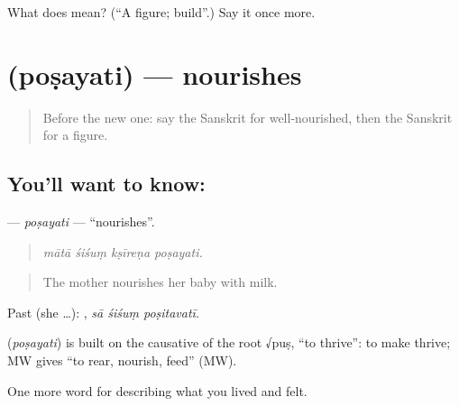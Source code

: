 \begin{tcolorbox}[breakable,colback=teal!4,colframe=teal!35!black,title={Before you move on}]
What does  mean? (\textquotedblleft{}A figure; build\textquotedblright{}.) Say it once more.
\end{tcolorbox}
\section[\texorpdfstring{\sk{पोषयति} (poṣayati)}{पोषयति (poṣayati)}]{ (poṣayati) — nourishes}

\label{lesson:SA-C476-posayati}



\begin{quote}
Before the new one: say the Sanskrit for well-nourished, then the Sanskrit for a figure.
\end{quote}

\subsection*{You'll want to know: }
\textbf{} — \emph{poṣayati} — \textquotedblleft{}nourishes\textquotedblright{}.

\begin{quote}
   
\end{quote}

\begin{quote}
\emph{mātā śiśuṃ kṣīreṇa poṣayati.}
\end{quote}

\begin{quote}
The mother nourishes her baby with milk.
\end{quote}

Past (she …):   , \emph{sā śiśuṃ poṣitavatī}.

\begin{cousinweb}
\textbf{} (\emph{poṣayati}) is built on the causative of the root √puṣ, \textquotedblleft{}to thrive\textquotedblright{}: to make thrive; MW gives \textquotedblleft{}to rear, nourish, feed\textquotedblright{} (MW).
\end{cousinweb}

\begin{grammarlens}[title={What you've built}]
One more word for describing what you lived and felt.
\end{grammarlens}

